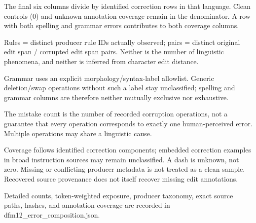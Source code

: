 \documentclass[10pt]{article}
\begin{document}
The final six columns divide by identified correction rows in that language. Clean controls (0) and unknown annotation coverage remain in the denominator. A row with both spelling and grammar errors contributes to both coverage columns.\par\smallskip
Rules = distinct producer rule IDs actually observed; pairs = distinct original edit span / corrupted edit span pairs. Neither is the number of linguistic phenomena, and neither is inferred from character edit distance.\par\smallskip
Grammar uses an explicit morphology/syntax-label allowlist. Generic deletion/swap operations without such a label stay unclassified; spelling and grammar columns are therefore neither mutually exclusive nor exhaustive.\par\smallskip
The mistake count is the number of recorded corruption operations, not a guarantee that every operation corresponds to exactly one human-perceived error. Multiple operations may share a linguistic cause.\par\smallskip
Coverage follows identified correction components; embedded correction examples in broad instruction sources may remain unclassified. A dash is unknown, not zero. Missing or conflicting producer metadata is not treated as a clean sample. Recovered source provenance does not itself recover missing edit annotations.\par\smallskip
Detailed counts, token-weighted exposure, producer taxonomy, exact source paths, hashes, and annotation coverage are recorded in dfm12\_error\_composition.json.\par\smallskip
\end{document}
